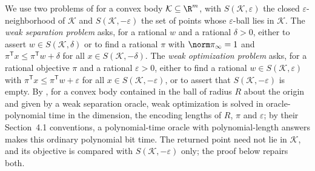 We use two problems of \citet[Section~2.1]{grotschel1988-geometric-algorithms-and-combinatorial-optimization}
for a convex body $\mathcal K\subseteq\R^m$, with
$S(\mathcal K,\varepsilon)$ the closed $\varepsilon$-neighborhood of
$\mathcal K$ and $S(\mathcal K,-\varepsilon)$ the set of points whose
$\varepsilon$-ball lies in $\mathcal K$. The \emph{weak separation problem}
asks, for a rational $w$ and a rational $\delta>0$, either to assert
$w\in S(\mathcal K,\delta)$ or to find a rational $\pi$ with
$\norm\pi_\infty=1$ and $\pi^{\mathsf T}x\le\pi^{\mathsf T}w+\delta$ for all
$x\in S(\mathcal K,-\delta)$. The \emph{weak optimization problem} asks, for
a rational objective $\pi$ and a rational $\varepsilon>0$, either to find a
rational $w\in S(\mathcal K,\varepsilon)$ with
$\pi^{\mathsf T}x\le\pi^{\mathsf T}w+\varepsilon$ for all
$x\in S(\mathcal K,-\varepsilon)$, or to assert that
$S(\mathcal K,-\varepsilon)$ is empty. By
\citet[Corollary~4.2.7]{grotschel1988-geometric-algorithms-and-combinatorial-optimization}, for a convex body
contained in the ball of radius $R$ about the origin and given by a weak
separation oracle, weak optimization is solved in oracle-polynomial time in
the dimension, the encoding lengths of $R$, $\pi$ and $\varepsilon$; by
their Section~4.1 conventions, a polynomial-time oracle with
polynomial-length answers makes this ordinary polynomial bit time. The
returned point need not lie in $\mathcal K$, and its objective is compared
with $S(\mathcal K,-\varepsilon)$ only; the proof below repairs both.

